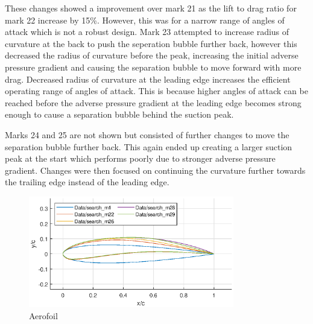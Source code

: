 \documentclass{article}
\begin{document}
These changes showed a improvement over mark 21 as the lift to drag ratio for mark 22 increase by 15\%.
However, this was for a narrow range of angles of attack which is not a robust design.
Mark 23 attempted to increase radius of curvature at the back to push the seperation bubble further back,
however this decreased the radius of curvature before the peak, increasing the initial adverse pressure gradient
and causing the separation bubble to move forward with more drag.
Decreased radius of curvature at the leading edge increases the efficient operating range of angles of attack.
This is because higher angles of attack can be reached before the adverse pressure gradient at the leading edge
becomes strong enough to cause a separation bubble behind the suction peak.

Marks 24 and 25 are not shown but consisted of further changes to move the separation bubble further back.
This again ended up creating a larger suction peak at the start which performs poorly due to stronger adverse pressure gradient.
Changes were then focused on continuing the curvature further towards the trailing edge instead of the leading edge.

\begin{figure}[H]
    \centering
    \includegraphics[width=0.8\textwidth]{figures/loRe_geometry_29.eps}
    \caption{Aerofoil}
    \label{fig:m29_geometry}
\end{figure}
\end{document}
